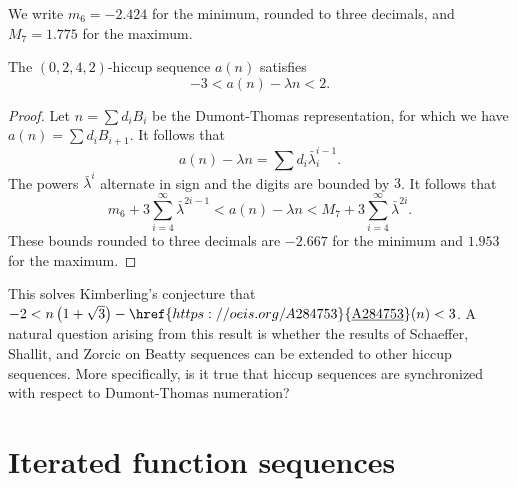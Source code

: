 \documentclass[12pt,reqno]{article}
\newcommand{\seqnum}[1]{\href{https://oeis.org/#1}{\rm \underline{#1}}}
\begin{document}
We write $m_6=-2.424$ for the minimum, rounded to three decimals, and
$M_7=1.775$ for the maximum.

\begin{theorem}\label{THM:kimbercon0242}
    The $(0,2,4,2)$-hiccup sequence $a(n)$ satisfies
    \[
    -3< a(n)-\lambda n< 2.
    \]
\end{theorem}
\begin{proof}
    Let $n=\sum d_iB_i$ be the Dumont-Thomas representation, for which
    we have $a(n)=\sum d_iB_{i+1}$. It follows that
    \[
    a(n)-\lambda n  =\sum d_i\bar\lambda_i^{i-1}.
    \]
    The powers $\bar\lambda^i$ alternate in sign and the digits are bounded by $3$.
    It follows that
    \[
        m_6+3\sum_{i=4}^\infty \bar\lambda^{2i-1} < a(n)-\lambda n < M_7+3\sum_{i=4}^\infty \bar\lambda^{2i}.
    \]
    These bounds rounded to three decimals are $-2.667$ for the minimum and $1.953$ for
    the maximum.
\end{proof}
This solves Kimberling's conjecture that $-2 < n\left(1 + \sqrt{3}\right) - \seqnum{A284753}(n) < 3$. A natural question arising from this result is whether the results of Schaeffer, Shallit, and Zorcic on Beatty sequences can be extended to other hiccup sequences. More specifically, is it true that hiccup sequences are synchronized
with respect to Dumont-Thomas numeration?
\newpage

\section{Iterated function sequences}
\end{document}
